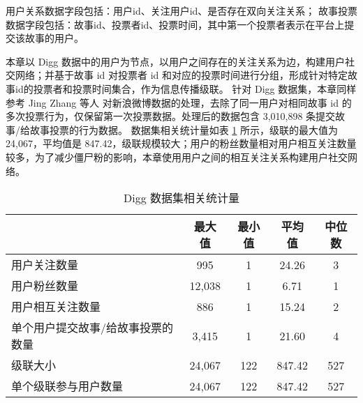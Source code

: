 用户关系数据字段包括：用户id、关注用户id、是否存在双向关注关系；
故事投票数据字段包括：故事id、投票者id、投票时间，其中第一个投票者表示在平台上提交该故事的用户。


本章以 Digg 数据中的用户为节点，以用户之间存在的关注关系为边，构建用户社交网络；并基于故事 id 对投票者 id 和对应的投票时间进行分组，形成针对特定故事id的投票者和投票时间集合，作为信息传播级联。
针对 Digg 数据集，本章同样参考 Jing Zhang 等人  \cite{zhang2013social} 对新浪微博数据的处理，去除了同一用户对相同故事 id 的多次投票行为，仅保留第一次投票数据。处理后的数据包含 3,010,898 条提交故事/给故事投票的行为数据。
数据集相关统计量如表 \ref{tabana:digg} 所示，级联的最大值为 24,067，平均值是 847.42，级联规模较大；用户的粉丝数量相对用户相互关注数量较多，为了减少僵尸粉的影响，本章使用用户之间的相互关注关系构建用户社交网络。


\begin{table}[]
	\begin{center}
		\caption{Digg 数据集相关统计量}
		\begin{tabular}{lcccc}
			\toprule[1.5pt]
			 & 最大值 & 最小值 & 平均值 & 中位数\\
			\midrule[1pt]
			用户关注数量 & 995 & 1 & 24.26 & 3 \\
			用户粉丝数量 & 12,038 & 1 & 6.71 & 1 \\
			用户相互关注数量 & 886 & 1 & 15.24 & 2 \\
			单个用户提交故事/给故事投票的数量 & 3,415 & 1 & 21.60 & 4 \\
			级联大小 & 24,067 & 122 & 847.42 & 527 \\
			单个级联参与用户数量 & 24,067 & 122 & 847.42 & 527 \\
			\bottomrule[1.5pt]
		\end{tabular}
		\label{tabana:digg}
		\vspace{\baselineskip}
	\end{center}
\end{table}


